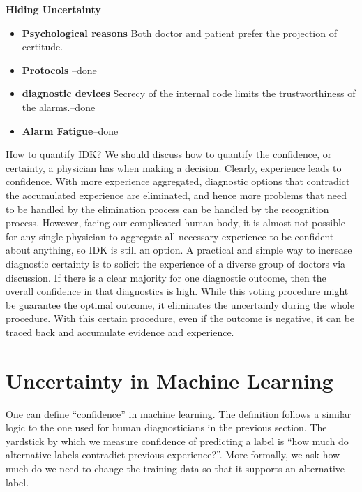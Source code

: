 \documentclass[11pt]{pnas-new}
\begin{document}
 {\bf Hiding Uncertainty}
  \begin{itemize}
    \item {\bf Psychological reasons} Both doctor and patient prefer
      the projection of certitude.
    \item {\bf Protocols} --done
    \item {\bf diagnostic devices} Secrecy of the internal code limits
      the trustworthiness of the alarms.--done
    \item{\bf Alarm Fatigue}--done
  \end{itemize}


How to quantify IDK? We should discuss how to quantify the confidence, or certainty, a physician has when making a decision. 
Clearly, experience leads to confidence. With more experience aggregated, diagnostic options that contradict the accumulated
  experience are eliminated, and hence more problems that need to be handled by the elimination process can be handled by the recognition process. However, facing our complicated human body, it is almost not possible for any single physician to aggregate all necessary experience to be confident about anything, so IDK is still an option. A practical and simple way to increase diagnostic certainty is to solicit the experience of a diverse group of doctors via discussion. If there is a clear majority for one diagnostic outcome,
      then the overall confidence in that diagnostics is high. While this voting procedure might be guarantee the optimal outcome, it eliminates the uncertainly during the whole procedure. With this certain procedure, even if the outcome is negative, it can be traced back and accumulate evidence and experience. 

\section{Uncertainty in Machine Learning}

One can define ``confidence'' in machine learning. The definition follows a
similar logic to the one used for human diagnosticians in the previous
section. The yardstick by which we measure confidence of predicting a
label is ``how much do alternative labels contradict previous
experience?''.
More formally, we ask how much do we need to change the training data
so that it supports an alternative label.
\end{document}
